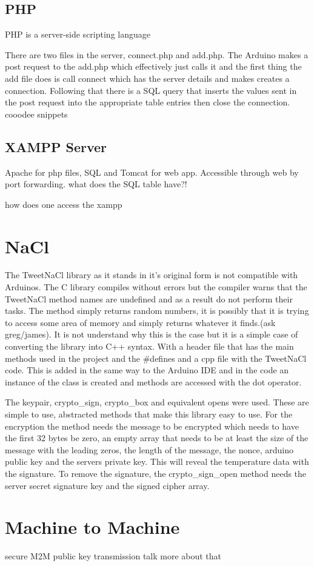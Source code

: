 \subsection{PHP}
PHP is a server-side scripting language 

There are two files in the server, connect.php and add.php. The Arduino makes a post request to the add.php which effectively just calls it and the first thing the add file does is call connect which has the server details and makes creates a connection. Following that there is a SQL query that inserts the values sent in the post request into the appropriate table entries then close the connection. cooodee snippets

\subsection{XAMPP Server}
Apache for php files, SQL and Tomcat for web app. Accessible through web by port forwarding.
what does the SQL table have?!

how does one access the xampp


\section{NaCl}

The TweetNaCl library as it stands in it's original form is not compatible with Arduinos. The C library compiles without errors but the compiler warns that the TweetNaCl method names are undefined and as a result do not perform their tasks. The method simply returns random numbers, it is possibly that it is trying to access some area of memory and simply returns whatever it finds.(ask greg/james). It is not understand why this is the case but it is a simple case of converting the library into C++ syntax. With a header file that has the main methods used in the project and the \#defines and a cpp file with the TweetNaCl code. This is added in the same way to the Arduino IDE and in the code an instance of the class is created and methods are accessed with the dot operator.

The keypair, crypto\_sign, crypto\_box and equivalent opens were used. These are simple to use, abstracted methods that make this library easy to use. For the encryption the method needs the message to be encrypted which needs to have the first 32 bytes be zero, an empty array that needs to be at least the size of the message with the leading zeros, the length of the message, the nonce, arduino public key and the servers private key. This will reveal the temperature data with the signature. To remove the signature, the crypto\_sign\_open method needs the server secret signature key and the signed cipher array.

\section{Machine to Machine}


secure M2M public key transmission
talk more about that